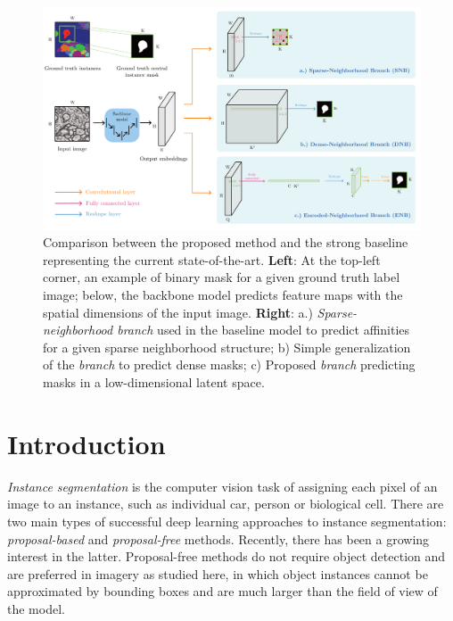 \begin{figure}[t]
\centering
        \includegraphics[width=\textwidth]{./figs/main_fig.pdf} %
        \caption{Comparison between the proposed method and the strong baseline representing the current state-of-the-art. \textbf{Left}: At the top-left corner, an example of binary \maskname mask for a given ground truth label image; below, the backbone model predicts feature maps with the spatial dimensions of the input image. \textbf{Right}: a.) \emph{Sparse-neighborhood branch} used in the baseline model to predict affinities for a given sparse neighborhood structure; b) Simple generalization of the \emph{\sparseBr branch} to predict dense \maskname masks; c) Proposed \emph{\encBr branch} predicting \maskname masks in a low-dimensional latent space.}
    \label{fig:main_figure}
\end{figure}




\section{Introduction}\label{sec:intro}

\emph{Instance segmentation} is the computer vision task of assigning each pixel of an image to an instance, such as individual car, person or biological cell. %
There are two main types of successful deep learning approaches to instance segmentation: \emph{proposal-based} and \emph{proposal-free} methods. 
Recently, there has been a growing interest in the latter. Proposal-free methods do not require object detection and are preferred in imagery as studied here, in which object instances cannot be approximated by bounding boxes and are much larger than the field of view of the model.  

